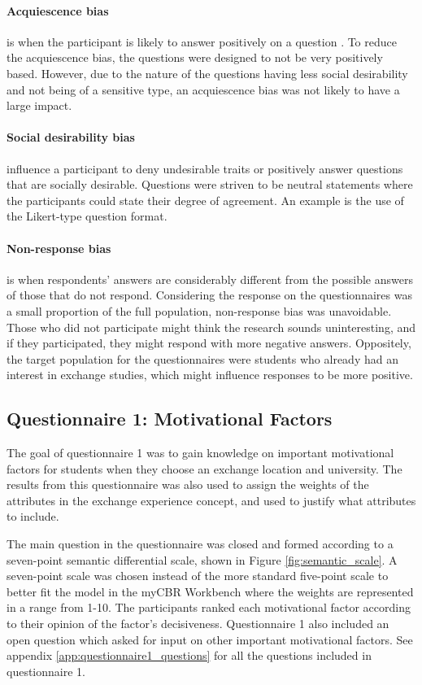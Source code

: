 \paragraph{Acquiescence bias} is when the participant is likely to answer positively on a question \cite{cronbach1946response}. To reduce the acquiescence bias, the questions were designed to not be very positively based. However, due to the nature of the questions having less social desirability and not being of a sensitive type, an acquiescence bias was not likely to have a large impact. 

\paragraph{Social desirability bias} influence a participant to deny undesirable traits or positively answer questions that are socially desirable. Questions were striven to be neutral statements where the participants could state their degree of agreement. An example is the use of the Likert-type question format. 


\paragraph{Non-response bias} is when respondents' answers are considerably different from the possible answers of those that do not respond. Considering the response on the questionnaires was a small proportion of the full population, non-response bias was unavoidable. Those who did not participate might think the research sounds uninteresting, and if they participated, they might respond with more negative answers. Oppositely, the target population for the questionnaires were students who already had an interest in exchange studies, which might influence responses to be more positive.

\subsection{Questionnaire 1: Motivational Factors}\label{sec:questionnaire_1}

The goal of questionnaire 1 was to gain knowledge on important motivational factors for students when they choose an exchange location and university. The results from this questionnaire was also used to assign the weights of the attributes in the exchange experience concept, and used to justify what attributes to include. 

The main question in the questionnaire was closed and formed according to a seven-point semantic differential scale, shown in Figure \ref{fig:semantic_scale}. A seven-point scale was chosen instead of the more standard five-point scale to better fit the model in the myCBR Workbench where the weights are represented in a range from 1-10. The participants ranked each motivational factor according to their opinion of the factor's decisiveness. Questionnaire 1 also included an open question which asked for input on other important motivational factors. See appendix \ref{app:questionnaire1_questions} for all the questions included in questionnaire 1. 

